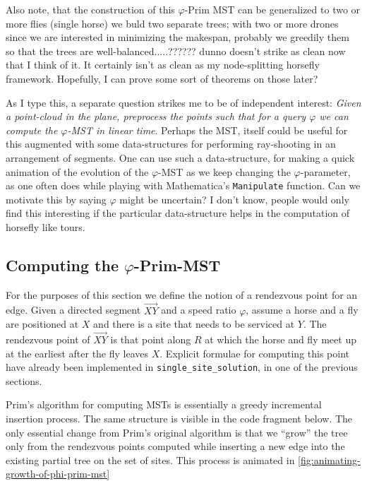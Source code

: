 \documentclass[11.5pt]{report}
\begin{document}
Also note, that the construction of this $\varphi$-Prim MST can be generalized to 
two or more flies (single horse) we buld two separate trees; with two or more drones
since we are interested in minimizing the makespan, probably we greedily them so that
the trees are well-balanced.....?????? dunno doesn't strike as clean now that I 
think of it. It certainly isn't as clean as my node-splitting horsefly framework. 
Hopefully, I can prove some sort of theorems on those later? 

\begin{note}
As I type this, a separate question strikes me to be of independent interest: 
\textit{Given a point-cloud in the plane, preprocess the points such that for a 
query $\varphi$ we can compute the $\varphi$-MST in linear time}. Perhaps the MST, 
itself could be useful for this augmented with some data-structures for performing 
ray-shooting in an arrangement of segments. One can use such a data-structure, for 
making a quick animation of the evolution of the $\varphi$-MST as we keep 
changing the $\varphi$-parameter, as one often does while playing with Mathematica's 
\texttt{Manipulate} function. Can we motivate this by saying $\varphi$ might be 
uncertain? I don't know, people would only find this interesting if the particular 
data-structure helps in the computation of horsefly like tours. 
\end{note}

\subsection*{Computing the $\varphi$-Prim-MST }

\newchunk For the purposes of this section we define the notion of a rendezvous 
point for an edge. Given a directed segment $\overrightarrow{XY}$ and a speed 
ratio $\varphi$, assume a horse and a fly are positioned at $X$ and there is a 
site that needs to be serviced at $Y$. The rendezvous point
of $\overrightarrow{XY}$ is that point along $R$ at which the horse and fly meet 
up at the earliest after the fly leaves $X$. Explicit formulae for computing this 
point have already been implemented in \verb|single_site_solution|, in one of the 
previous sections. 

\newchunk Prim's algorithm for computing MSTs is essentially a greedy incremental 
insertion process. The same structure is visible in the code fragment below. The only
essential change from Prim's original algorithm is that we ``grow'' the tree only from 
the rendezvous points computed while inserting a new edge into the existing partial 
tree on the set of sites. This process is animated in 
\autoref{fig:animating-growth-of-phi-prim-mst}
\end{document}
